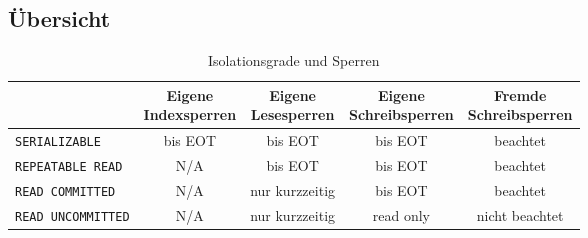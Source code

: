         \subsection{Übersicht} %
        	\begin{table}[H]
        		\centering
        		\begin{tabular}{l | c | c | c | c}
        			                             & \makecell{Eigene \\ Indexsperren} & \makecell{Eigene \\ Lesesperren} & \makecell{Eigene \\ Schreibsperren} & \makecell{Fremde \\ Schreibsperren} \\ \hline
        			\lstinline|SERIALIZABLE|     & bis EOT                           & bis EOT                          & bis EOT                             & beachtet                            \\
        			\lstinline|REPEATABLE READ|  & N/A                               & bis EOT                          & bis EOT                             & beachtet                            \\
        			\lstinline|READ COMMITTED|   & N/A                               & nur kurzzeitig                   & bis EOT                             & beachtet                            \\
        			\lstinline|READ UNCOMMITTED| & N/A                               & nur kurzzeitig                   & read only                           & nicht beachtet
        		\end{tabular}
        		\caption{Isolationsgrade und Sperren}
            \end{table}


